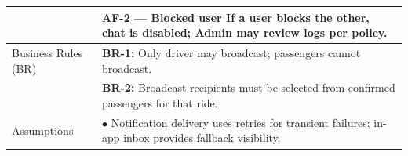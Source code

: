 \begin{longtable}{|>{\raggedright\arraybackslash}p{4cm}|>{\raggedright\arraybackslash}p{11cm}|}
& \textbf{AF-2 — Blocked user} \newline If a user blocks the other, chat is disabled; Admin may review logs per policy. \\
\hline
Business Rules (BR) & \textbf{BR-1:} Only driver may broadcast; passengers cannot broadcast. \\
& \textbf{BR-2:} Broadcast recipients must be selected from confirmed passengers for that ride. \\
\hline
Assumptions & $\bullet$ Notification delivery uses retries for transient failures; in-app inbox provides fallback visibility. \\
\end{longtable}

